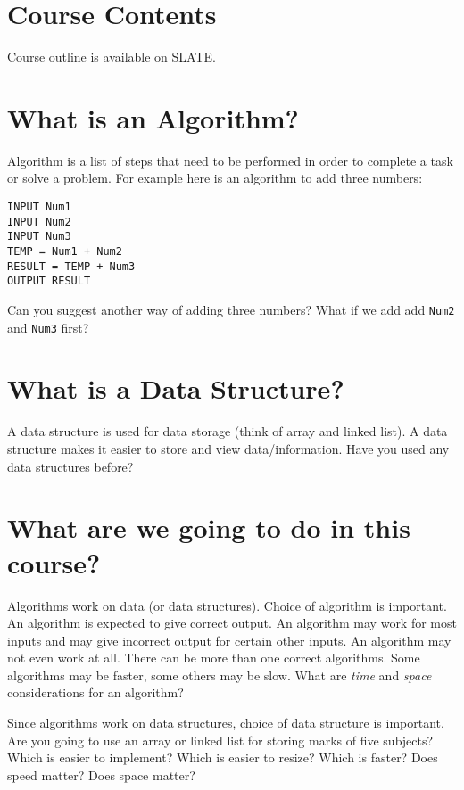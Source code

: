 \documentclass[12pt,a4paper]{article}
\begin{document}
\section{Course Contents}
Course outline is available on SLATE.
\section{What is an Algorithm?}
Algorithm is a list of steps that need to be performed in order to complete a task or solve a problem. For example here is an algorithm to add three numbers:
\begin{lstlisting}[caption={Algorithm to add three numbers}]
INPUT Num1
INPUT Num2
INPUT Num3
TEMP = Num1 + Num2
RESULT = TEMP + Num3
OUTPUT RESULT
\end{lstlisting}
Can you suggest another way of adding three numbers? What if we add add \verb|Num2| and \verb|Num3| first?
\section{What is a Data Structure?}
A data structure is used for data storage (think of array and linked list). A data structure makes it easier to store and view data/information. Have you used any data structures before?
\section{What are we going to do in this course?}
Algorithms work on data (or data structures). Choice of algorithm is important. An algorithm is expected to give correct output. An algorithm may work for most inputs and may give incorrect output for certain other inputs. An algorithm may not even work at all. There can be more than one correct algorithms. Some algorithms may be faster, some others may be slow. What are \textit{time} and \textit{space} considerations for an algorithm?

Since algorithms work on data structures, choice of data structure is important. Are you going to use an array or linked list for storing marks of five subjects? Which is easier to implement? Which is easier to resize? Which is faster? Does speed matter? Does space matter?
\end{document}
